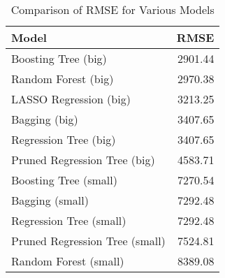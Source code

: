 \begin{table}[ht]
\centering
\caption{Comparison of RMSE for Various Models} 
\label{tab:rmse_comp}
\begin{tabular}{lr}
  \hline
Model & RMSE \\ 
  \hline
Boosting Tree (big) & 2901.44 \\ 
  Random Forest (big) & 2970.38 \\ 
  LASSO Regression (big) & 3213.25 \\ 
  Bagging (big) & 3407.65 \\ 
  Regression Tree (big) & 3407.65 \\ 
  Pruned Regression Tree (big) & 4583.71 \\ 
  Boosting Tree (small) & 7270.54 \\ 
  Bagging (small) & 7292.48 \\ 
  Regression Tree (small) & 7292.48 \\ 
  Pruned Regression Tree (small) & 7524.81 \\ 
  Random Forest (small) & 8389.08 \\ 
   \hline
\end{tabular}
\end{table}

